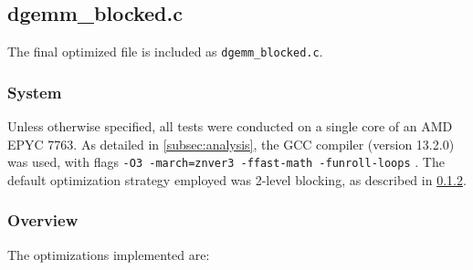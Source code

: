 \documentclass[unicode,10pt,a4paper,oneside,numbers=endperiod,openany]{scrartcl}
\begin{document}
\subsection{dgemm\_blocked.c}
The final optimized file is included as \verb|dgemm_blocked.c|.

\subsubsection{System}
Unless otherwise specified, all tests were conducted on a single core of an AMD EPYC 7763. As detailed in \ref{subsec:analysis}, the GCC compiler (version 13.2.0) was used, with flags \verb|-O3 -march=znver3 -ffast-math -funroll-loops| \cite{gcc_manual}. The default optimization strategy employed was 2-level blocking, as described in \ref{subsubsec:overview}.

\subsubsection{Overview}
\label{subsubsec:overview}
The optimizations implemented are:
\end{document}
